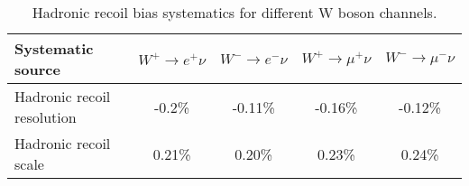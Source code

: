 \begin{table}[!tbp]
\caption{Hadronic recoil bias systematics for different W boson channels.}
\label{tab:SFHadronRecoilBias}
\begin{center}
\begin{tabular}{| l || c | c | c | c |}
\hline
Systematic source & $W^{+} \to e^{+}\nu$ & $W^{-} \to e^{-}\nu$  & $W^{+} \to \mu^{+}\nu$ & $W^{-} \to \mu^{-}\nu$ \\
\hline
\hline
Hadronic recoil resolution & -0.2\% & -0.11\% & -0.16\% & -0.12\% \\
Hadronic recoil scale &  0.21\% & 0.20\% & 0.23\% & 0.24\% \\
\hline
\end{tabular}
\end{center}
\end{table}